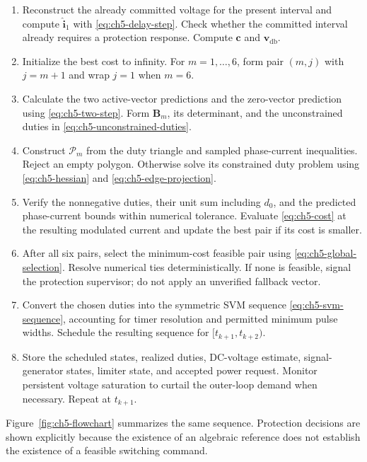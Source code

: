 \begin{enumerate}
\item Reconstruct the already committed voltage for the present interval and compute $\widehat{\mathbf i}_1$ with \eqref{eq:ch5-delay-step}. Check whether the committed interval already requires a protection response. Compute $\mathbf c$ and $\mathbf v_{\mathrm{db}}$.
\item Initialize the best cost to infinity. For $m=1,\ldots,6$, form pair $(m,j)$ with $j=m+1$ and wrap $j=1$ when $m=6$.
\item Calculate the two active-vector predictions and the zero-vector prediction using \eqref{eq:ch5-two-step}. Form $\mathbf B_m$, its determinant, and the unconstrained duties in \eqref{eq:ch5-unconstrained-duties}.
\item Construct $\mathcal P_m$ from the duty triangle and sampled phase-current inequalities. Reject an empty polygon. Otherwise solve its constrained duty problem using \eqref{eq:ch5-hessian} and \eqref{eq:ch5-edge-projection}.
\item Verify the nonnegative duties, their unit sum including $d_0$, and the predicted phase-current bounds within numerical tolerance. Evaluate \eqref{eq:ch5-cost} at the resulting modulated current and update the best pair if its cost is smaller.
\item After all six pairs, select the minimum-cost feasible pair using \eqref{eq:ch5-global-selection}. Resolve numerical ties deterministically. If none is feasible, signal the protection supervisor; do not apply an unverified fallback vector.
\item Convert the chosen duties into the symmetric SVM sequence \eqref{eq:ch5-svm-sequence}, accounting for timer resolution and permitted minimum pulse widths. Schedule the resulting sequence for $[t_{k+1},t_{k+2})$.
\item Store the scheduled states, realized duties, DC-voltage estimate, signal-generator states, limiter state, and accepted power request. Monitor persistent voltage saturation to curtail the outer-loop demand when necessary. Repeat at $t_{k+1}$.
\end{enumerate}
Figure~\ref{fig:ch5-flowchart} summarizes the same sequence. Protection decisions are shown explicitly because the existence of an algebraic reference does not establish the existence of a feasible switching command.

